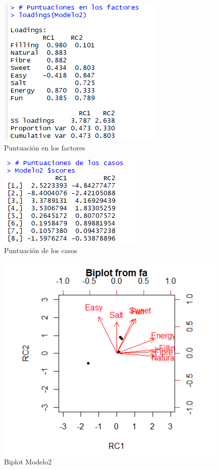 \documentclass[12pt,a4paper]{book}
\begin{document}
\begin{figure}[H]
\centering
\includegraphics[scale=1]{Captura19.png} 
\caption{Puntuación en los factores}
\label{fig:pff}
\end{figure}
\begin{figure}[H]
\centering
\includegraphics[scale=1]{Captura20.png} 
\caption{Puntuación de los casos}
\label{fig:pff}
\end{figure}
\begin{figure}[H]
\centering
\includegraphics[scale=1]{Captura21.png} 
\caption{Biplot Modelo2}
\label{fig:pff}
\end{figure}
\end{document}
